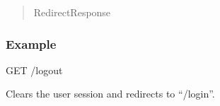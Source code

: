 \documentclass[letterpaper,10pt,english]{sphinxmanual}
\begin{document}
\begin{fulllineitems}
\begin{quote}
\begin{description}
\sphinxAtStartPar
RedirectResponse

\end{description}\end{quote}
\subsubsection*{Example}
\begin{description}
\sphinxAtStartPar
GET /logout

\sphinxAtStartPar
Clears the user session and redirects to “/login”.

\end{description}

\end{fulllineitems}

\end{document}
